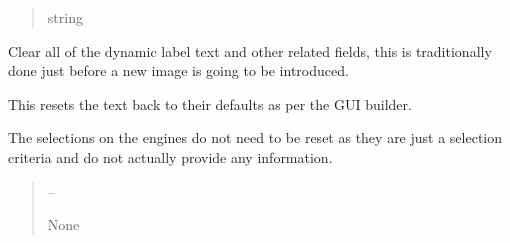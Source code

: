 \documentclass[letterpaper,11pt,english]{sphinxmanual}
\begin{document}
\begin{savenotes}
\begin{fulllineitems}
\begin{savenotes}
\begin{fulllineitems}
\begin{quote}
\begin{description}
\sphinxAtStartPar
string

\end{description}\end{quote}

\end{fulllineitems}\end{savenotes}


\begin{savenotes}\begin{fulllineitems}
\label{\detokenize{code/opihiexarata.gui.manual:opihiexarata.gui.manual.OpihiManualWindow.clear_dynamic_label_text}}
\pysigstartsignatures
{}
\pysigstopsignatures
\sphinxAtStartPar
Clear all of the dynamic label text and other related fields,
this is traditionally done just before a new image is going to be
introduced.

\sphinxAtStartPar
This resets the text back to their defaults as per the GUI builder.

\sphinxAtStartPar
The selections on the engines do not need to be reset as they are
just a selection criteria and do not actually provide any information.
\begin{quote}\begin{description}
\sphinxAtStartPar
{} – 

\sphinxAtStartPar
None

\end{description}\end{quote}

\end{fulllineitems}\end{savenotes}



\end{fulllineitems}
\end{savenotes}
\end{document}
